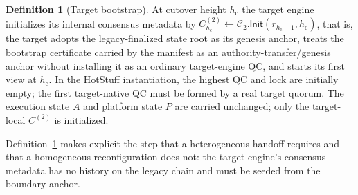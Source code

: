 \documentclass[journal]{IEEEtran}
\theoremstyle{definition}
\newtheorem{definition}{Definition}
\theoremstyle{remark}
\begin{document}
\begin{definition}[Target bootstrap]
\label{def:bootstrap}
At cutover height $h_{\mathrm{c}}$ the target engine initializes its internal consensus
metadata by $C^{(2)}_{h_{\mathrm{c}}} \gets \mathcal{C}_2.\mathsf{Init}(r_{h_{\mathrm{c}}-1},
h_{\mathrm{c}})$, that is, the target adopts the legacy-finalized state root as its genesis
anchor, treats the bootstrap certificate carried by the manifest as an authority-transfer/genesis
anchor without installing it as an ordinary target-engine QC, and starts its first view at
$h_{\mathrm{c}}$. In the HotStuff instantiation, the highest QC and lock are initially empty; the
first target-native QC must be formed by a real target quorum. The execution state $A$ and
platform state $P$ are carried unchanged; only the target-local $C^{(2)}$ is initialized.
\end{definition}
Definition~\ref{def:bootstrap} makes explicit the step that a heterogeneous handoff requires
and that a homogeneous reconfiguration does not: the target engine's consensus metadata has no
history on the legacy chain and must be seeded from the boundary anchor.
\end{document}
